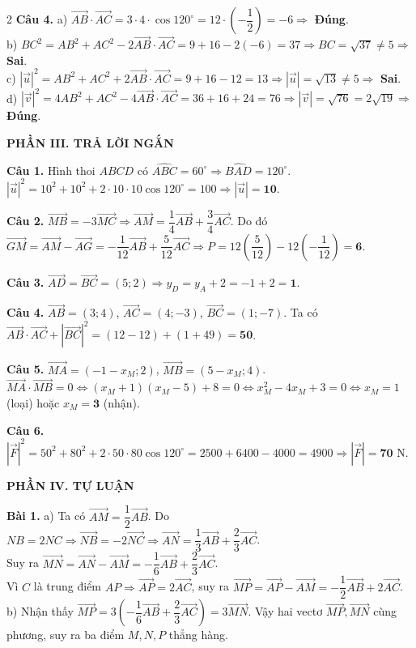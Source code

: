 \documentclass[10pt,a4paper]{article}
\begin{document}
\begin{multicols}{2}
\textbf{Câu 4.}
a) $\vec{AB} \cdot \vec{AC} = 3 \cdot 4 \cdot \cos 120^\circ = 12 \cdot \left(-\dfrac{1}{2}\right) = -6 \Rightarrow$ \textbf{Đúng}.\\
b) $BC^2 = AB^2 + AC^2 - 2\vec{AB}\cdot\vec{AC} = 9 + 16 - 2(-6) = 37 \Rightarrow BC = \sqrt{37} \ne 5 \Rightarrow$ \textbf{Sai}.\\
c) $|\vec{u}|^2 = AB^2 + AC^2 + 2\vec{AB}\cdot\vec{AC} = 9 + 16 - 12 = 13 \Rightarrow |\vec{u}| = \sqrt{13} \ne 5 \Rightarrow$ \textbf{Sai}.\\
d) $|\vec{v}|^2 = 4AB^2 + AC^2 - 4\vec{AB}\cdot\vec{AC} = 36 + 16 + 24 = 76 \Rightarrow |\vec{v}| = \sqrt{76} = 2\sqrt{19} \Rightarrow$ \textbf{Đúng}.

\textbf{\color{accent}PHẦN III. TRẢ LỜI NGẮN}

\textbf{Câu 1.} Hình thoi $ABCD$ có $\widehat{ABC} = 60^\circ \Rightarrow \widehat{BAD} = 120^\circ$. $|\vec{u}|^2 = 10^2 + 10^2 + 2\cdot 10\cdot 10\cos 120^\circ = 100 \Rightarrow |\vec{u}| = \mathbf{10}$.

\textbf{Câu 2.} $\vec{MB} = -3\vec{MC} \Rightarrow \vec{AM} = \dfrac{1}{4}\vec{AB} + \dfrac{3}{4}\vec{AC}$. Do đó $\vec{GM} = \vec{AM} - \vec{AG} = -\dfrac{1}{12}\vec{AB} + \dfrac{5}{12}\vec{AC} \Rightarrow P = 12\left(\dfrac{5}{12}\right) - 12\left(-\dfrac{1}{12}\right) = \mathbf{6}$.

\textbf{Câu 3.} $\vec{AD} = \vec{BC} = (5; 2) \Rightarrow y_D = y_A + 2 = -1 + 2 = \mathbf{1}$.

\textbf{Câu 4.} $\vec{AB} = (3; 4)$, $\vec{AC} = (4; -3)$, $\vec{BC} = (1; -7)$. Ta có $\vec{AB}\cdot\vec{AC} + |\vec{BC}|^2 = (12 - 12) + (1 + 49) = \mathbf{50}$.

\textbf{Câu 5.} $\vec{MA} = (-1 - x_M; 2)$, $\vec{MB} = (5 - x_M; 4)$. $\vec{MA}\cdot\vec{MB} = 0 \Leftrightarrow (x_M + 1)(x_M - 5) + 8 = 0 \Leftrightarrow x_M^2 - 4x_M + 3 = 0 \Leftrightarrow x_M = 1$ (loại) hoặc $x_M = \mathbf{3}$ (nhận).

\textbf{Câu 6.} $|\vec{F}|^2 = 50^2 + 80^2 + 2\cdot 50\cdot 80\cos 120^\circ = 2500 + 6400 - 4000 = 4900 \Rightarrow |\vec{F}| = \mathbf{70}\text{ N}$.

\textbf{\color{accent}PHẦN IV. TỰ LUẬN}

\textbf{Bài 1.}
a) Ta có $\vec{AM} = \dfrac{1}{2}\vec{AB}$. Do $NB = 2NC \Rightarrow \vec{NB} = -2\vec{NC} \Rightarrow \vec{AN} = \dfrac{1}{3}\vec{AB} + \dfrac{2}{3}\vec{AC}$.\\
Suy ra $\vec{MN} = \vec{AN} - \vec{AM} = -\dfrac{1}{6}\vec{AB} + \dfrac{2}{3}\vec{AC}$.\\
Vì $C$ là trung điểm $AP \Rightarrow \vec{AP} = 2\vec{AC}$, suy ra $\vec{MP} = \vec{AP} - \vec{AM} = -\dfrac{1}{2}\vec{AB} + 2\vec{AC}$.\\
b) Nhận thấy $\vec{MP} = 3\left(-\dfrac{1}{6}\vec{AB} + \dfrac{2}{3}\vec{AC}\right) = 3\vec{MN}$. Vậy hai vectơ $\vec{MP}, \vec{MN}$ cùng phương, suy ra ba điểm $M, N, P$ thẳng hàng.


\end{multicols}
\end{document}
